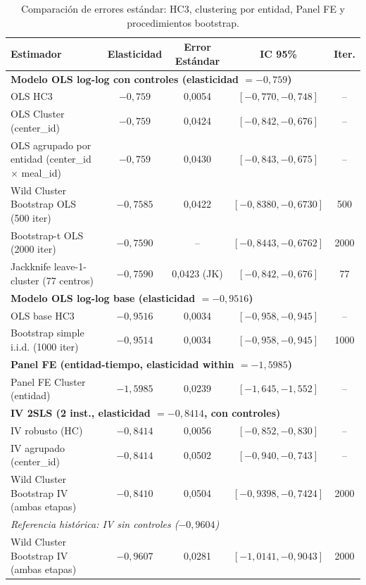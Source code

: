 \documentclass[doc, a4paper, biblatex, floatsintext, longtable, babel]{apa7}
\begin{document}
\begin{table}[!htbp]
\centering
\caption{Comparación de errores estándar: HC3, clustering por entidad, Panel FE y procedimientos bootstrap.}
\label{tab:comparacion_ee}
\footnotesize
\begin{tabular}{lcccc}
\toprule
Estimador & Elasticidad & Error Estándar & IC 95\% & Iter. \\
\midrule
\multicolumn{5}{l}{\textbf{Modelo OLS log-log con controles (elasticidad $=-0,759$)}} \\
OLS HC3 & $-0,759$ & 0,0054 & $[-0,770, -0,748]$ & -- \\
OLS Cluster (center\_id) & $-0,759$ & 0,0424 & $[-0,842, -0,676]$ & -- \\
OLS agrupado por entidad (center\_id $\times$ meal\_id) & $-0,759$ & 0,0430 & $[-0,843, -0,675]$ & -- \\
Wild Cluster Bootstrap OLS (500 iter) & $-0,7585$ & 0,0422 & $[-0,8380, -0,6730]$ & 500 \\
Bootstrap-t OLS (2000 iter) & $-0,7590$ & -- & $[-0,8443, -0,6762]$ & 2000 \\
Jackknife leave-1-cluster (77 centros) & $-0,7590$ & 0,0423 (JK) & $[-0,842, -0,676]$ & 77 \\
\midrule
\multicolumn{5}{l}{\textbf{Modelo OLS log-log base (elasticidad $=-0,9516$)}} \\
OLS base HC3 & $-0,9516$ & 0,0034 & $[-0,958, -0,945]$ & -- \\
Bootstrap simple i.i.d. (1000 iter) & $-0,9514$ & 0,0034 & $[-0,958, -0,945]$ & 1000 \\
\midrule
\multicolumn{5}{l}{\textbf{Panel FE (entidad-tiempo, elasticidad within $=-1,5985$)}} \\
Panel FE Cluster (entidad) & $-1,5985$ & 0,0239 & $[-1,645, -1,552]$ & -- \\
\midrule
\multicolumn{5}{l}{\textbf{IV 2SLS (2 inst., elasticidad $=-0,8414$, con controles)}} \\
IV robusto (HC) & $-0,8414$ & 0,0056 & $[-0,852, -0,830]$ & -- \\
IV agrupado (center\_id) & $-0,8414$ & 0,0502 & $[-0,940, -0,743]$ & -- \\
Wild Cluster Bootstrap IV (ambas etapas) & $-0,8410$ & 0,0504 & $[-0,9398, -0,7424]$ & 2000 \\
\multicolumn{5}{l}{\textit{Referencia histórica: IV sin controles ($-0,9604$)}} \\
Wild Cluster Bootstrap IV (ambas etapas) & $-0,9607$ & 0,0281 & $[-1,0141, -0,9043]$ & 2000 \\
\bottomrule
\end{tabular}
\end{table}
\end{document}
